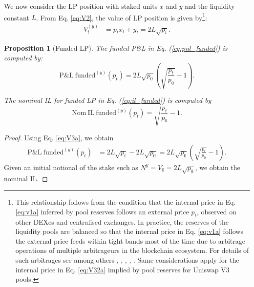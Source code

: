 \documentclass[pdftex,11pt,a4paper] {article}
\newtheorem{proposition}{Proposition}[section]
\begin{document}
We now consider the LP position with staked units $x$ and $y$ and the liquidity constant $L$. From Eq. \eqref{eq:V2}, the value of LP position is given by\footnote{%
This relationship follows from the condition that the internal price in Eq. %
\eqref{eq:v1a} inferred by pool reserves follows an external price $p_t$,
observed on other DEXes and centralised exchanges. In practice, the reserves of the
liquidity pools are balanced so that the internal price in Eq. \eqref{eq:v1a} follows the external price feeds within tight bands most of the time due to
arbitrage operations of multiple arbitrageurs in the blockchain ecosystem. For
details of such arbitrages see among others \citet{Milionis2022}, %
\citet{Park2023}, \citet{Lehar2024}, \citet{Cartea2024}, \citet{Cartea2024a}.
Same considerations apply for the internal price in Eq. \eqref{eq:V32a}
implied by pool reserves for Uniswap V3 pools.}:
\begin{equation}  \label{eq:V3a}
\begin{split}
V^{(y)}_{t} & = p_{t} x_{t} + y_{t} = 2 L \sqrt{p_{t}}.
\end{split}%
\end{equation}

\begin{proposition}[Funded LP]
The funded P\&L in Eq. (\ref{eq:pnl_funded}) is computed by:
\begin{equation}  \label{eq:pnl_funded_V2}
\mathrm{P\&L \ funded}^{(y)}(p_{t}) = 2 L \sqrt{p_{0}} \left( \sqrt{\frac{p_{t}}{p_{0}%
}} -1 \right).
\end{equation}

The nominal IL for funded LP in Eq. (\ref{eq:il_funded}) is computed by
\begin{equation}  \label{eq:il_funded_V2}
\mathrm{Nom \ IL \ funded}^{(y)}(p_{t}) = \sqrt{\frac{p_{t}}{p_{0}}} -1.
\end{equation}
\end{proposition}

\begin{proof}
Using Eq. \eqref{eq:V3a}, we obtain
\begin{equation} \label{eq:V3aa}
\begin{split}
\mathrm{P\&L \ funded}^{(y)}(p_{t}) & = 2 L \sqrt{p_{t}} - 2 L \sqrt{p_{0}}  = 2 L \sqrt{p_{0}}  \left( \sqrt{\frac{p_{t}}{p_{0}}} -1 \right).
\end{split}
\end{equation}
Given an initial notional of the stake such as $N^y=V_{0}=2L\sqrt{p_{0}}$, we obtain the nominal IL.
\end{proof}
\end{document}
